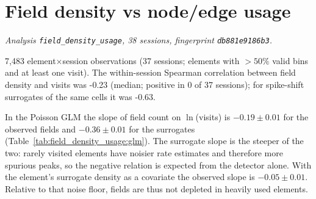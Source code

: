 \section{Field density vs node/edge usage}
\label{sec:field_density_usage}
\noindent\textit{Analysis \texttt{field\_density\_usage}, 38 sessions, fingerprint \texttt{db881e9186b3}.}

7{,}483 element$\times$session observations (37 sessions; elements with $>50\%$ valid bins and at least one visit). The within-session Spearman correlation between field density and visits was -0.23 (median; positive in 0 of 37 sessions); for spike-shift surrogates of the same cells it was -0.63.

In the Poisson GLM the slope of field count on $\ln$(visits) is $-0.19 \pm 0.01$ for the observed fields and $-0.36 \pm 0.01$ for the surrogates (Table~\ref{tab:field_density_usage:glm}). The surrogate slope is the steeper of the two: rarely visited elements have noisier rate estimates and therefore more spurious peaks, so the negative relation is expected from the detector alone. With the element's surrogate density as a covariate the observed slope is $-0.05 \pm 0.01$. Relative to that noise floor, fields are thus not depleted in heavily used elements.

